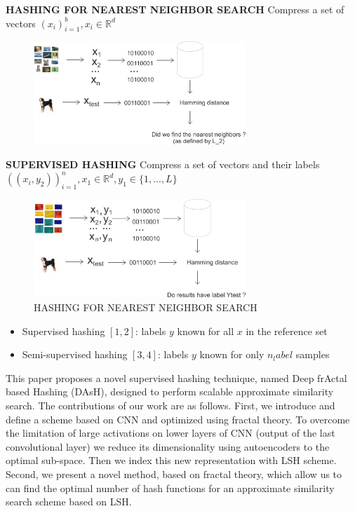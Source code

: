 \documentclass{article}
\begin{document}
\textbf{HASHING FOR NEAREST NEIGHBOR SEARCH}
Compress a set of vectors $(x_i)^{b}_{i=1}, x_i \in \mathbb{R}^{d}$
\begin{figure}[htp]
\includegraphics[width=8cm]{dash/11.PNG}
\centering
\end{figure}

\textbf{SUPERVISED HASHING}
Compress a set of vectors and their labels  $((x_i,y_2))^{n}_{i=1}, x_1\in \mathbb{R}^{d}, y_1 \in \{1,...,L\} $
\begin{figure}[htp]
\includegraphics[width=8cm]{dash/12.png}
\centering
\caption{ HASHING FOR NEAREST NEIGHBOR SEARCH }
\end{figure}

\begin{itemize}
\item Supervised hashing $[1, 2]$: labels $y$ known for all $x$ in the reference set
\item Semi-supervised hashing $[3, 4]$: labels $y$ known for only $n_label$ samples
\end{itemize}

 
 This paper proposes a novel supervised hashing technique,  named  Deep frActal based  Hashing (DAsH),  designed to perform scalable approximate similarity search. The contributions of our work are as follows. First,  we introduce and define a  scheme based on CNN and optimized using fractal theory. To overcome the limitation of large activations on lower layers of CNN (output of the last convolutional layer) we reduce its dimensionality using autoencoders  to the optimal sub-space. Then we index this new representation with LSH scheme.  Second, we present a novel method, based on fractal theory, which allow us to can find the optimal number of hash functions for an approximate similarity search scheme based on LSH.
\end{document}
